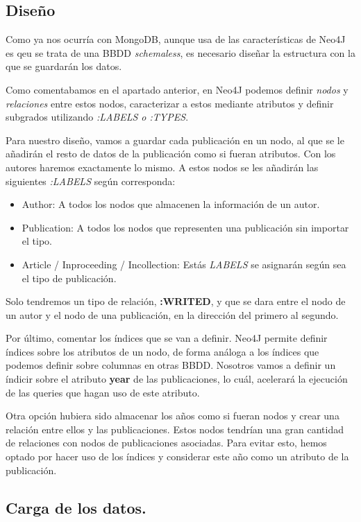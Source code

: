 \subsection{Diseño}

Como ya nos ocurría con MongoDB, aunque usa de las características de Neo4J es qeu se trata de una \gls{BBDD} \textit{schemaless}, es necesario diseñar la estructura con la que se guardarán los datos. 

Como comentabamos en el apartado anterior, en Neo4J podemos definir \textit{nodos} y \textit{relaciones} entre estos nodos, caracterizar a estos mediante atributos y definir subgrados utilizando \textit{:LABELS o :TYPES}. 

Para nuestro diseño, vamos a guardar cada publicación en un nodo, al que se le añadirán el resto de datos de la publicación como si fueran atributos. Con los autores haremos exactamente lo mismo. A estos nodos se les añadirán las siguientes \textit{:LABELS} según corresponda:

\begin{itemize}
 \item Author: A todos los nodos que almacenen la información de un autor.
 \item Publication: A todos los nodos que representen una publicación sin importar el tipo.
 \item Article / Inproceeding / Incollection: Estás \textit{LABELS} se asignarán según sea el tipo de publicación. 
\end{itemize}

Solo tendremos un tipo de relación, \textbf{:WRITED}, y que se dara entre el nodo de un autor y el nodo de una publicación, en la dirección del primero al segundo.

Por último, comentar los índices que se van a definir. Neo4J permite definir índices sobre los atributos de un nodo, de forma análoga a los índices que podemos definir sobre columnas en otras \gls{BBDD}. Nosotros vamos a definir un índicir sobre el atributo \textbf{year} de las publicaciones, lo cuál, acelerará la ejecución de las queries que hagan uso de este atributo.

Otra opción hubiera sido almacenar los años como si fueran nodos y crear una relación entre ellos y las publicaciones. Estos nodos tendrían una gran cantidad de relaciones con nodos de publicaciones asociadas. Para evitar esto, hemos optado por hacer uso de los índices y considerar este año como un atributo de la publicación.

\subsection{Carga de los datos.}

